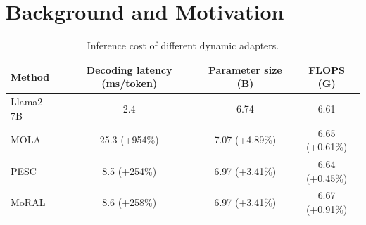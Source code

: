 
\section{Background and Motivation}


\begin{table}[t]
    \centering
    
    \begin{tabular}{lccc}
    \toprule
    Method & Decoding latency (ms/token) & Parameter size (B) & FLOPS (G) \\
    \midrule
    Llama2-7B  & 2.4 & 6.74 & 6.61 \\
    MOLA~\cite{gao2024higher} & 25.3 (+954\%) & 7.07 (+4.89\%) & 6.65 (+0.61\%) \\
    PESC~\cite{wu2024parameter} & 8.5 (+254\%) & 6.97 (+3.41\%) & 6.64 (+0.45\%) \\
    MoRAL~\cite{yang2024moral} & 8.6 (+258\%) & 6.97 (+3.41\%) & 6.67 (+0.91\%) \\
    \bottomrule
    \end{tabular}
    
    \caption{Inference cost of different dynamic adapters.}
    \label{table:moa_latency}
\end{table}

